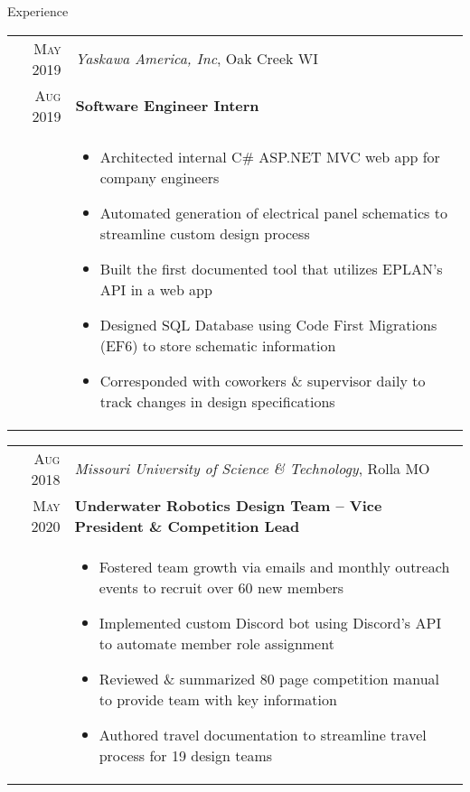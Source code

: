 \documentclass{resume}
\begin{document}
\begin{rSection}{Experience}
{  \begin{tabular}{r|p{15cm}}
    \textsc{May 2019} & \textit{Yaskawa America, Inc}, Oak Creek WI \\
    \textsc{Aug 2019}  & \textbf{Software Engineer Intern} \\ &
    \begin{itemize}
        \item {Architected internal C\# ASP.NET MVC web app for company engineers}
        \item {Automated generation of electrical panel schematics to streamline custom design process}
        \item {Built the first documented tool that utilizes EPLAN's API in a web app}
        \item {Designed SQL Database using Code First Migrations (EF6) to store schematic information}
        \item {Corresponded with coworkers \& supervisor daily to track changes in design specifications}
    \end{itemize}
  \end{tabular}

    \begin{tabular}{r|p{15cm}}
      \textsc{Aug 2018} & \textit{Missouri University of Science \& Technology}, Rolla MO \\
      \textsc{May 2020}  & \textbf{Underwater Robotics Design Team – Vice President \& Competition Lead} \\ &
      \begin{itemize}
        \item {Fostered team growth via emails and monthly outreach events to recruit over 60 new members}
        \item {Implemented custom Discord bot using Discord's API to automate member role assignment}
        \item {Reviewed \& summarized 80 page competition manual to provide team with key information}
        \item {Authored travel documentation to streamline travel process for 19 design teams}
      \end{itemize}
    \end{tabular}

}
\end{rSection}
\end{document}
